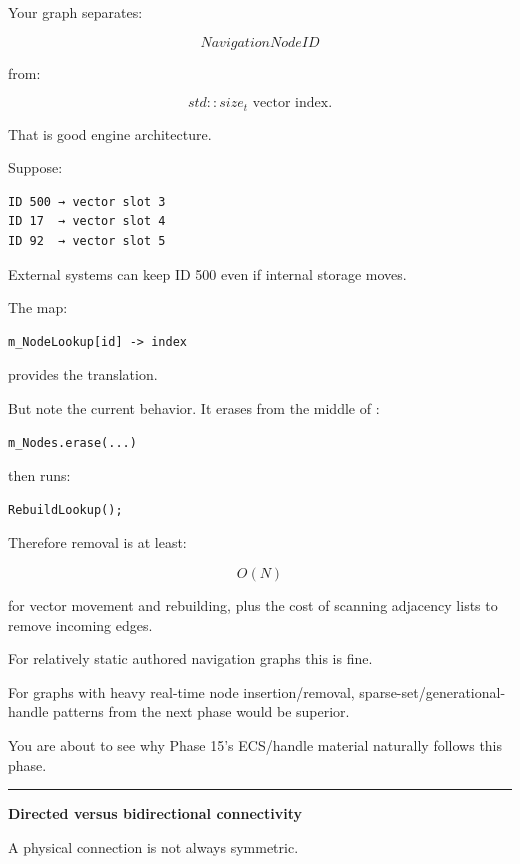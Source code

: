 Your graph separates:

\[
NavigationNodeID
\]

from:

\[
std::size_t\text{ vector index}.
\]

That is good engine architecture.

Suppose:

\begin{verbatim}
ID 500 → vector slot 3
ID 17  → vector slot 4
ID 92  → vector slot 5
\end{verbatim}

External systems can keep ID 500 even if internal storage moves.

The map:

\begin{verbatim}
m_NodeLookup[id] -> index
\end{verbatim}

provides the translation.

But note the current  behavior. It erases from the middle of :

\begin{verbatim}
m_Nodes.erase(...)
\end{verbatim}

then runs:

\begin{verbatim}
RebuildLookup();
\end{verbatim}

Therefore removal is at least:

\[
O(N)
\]

for vector movement and rebuilding, plus the cost of scanning adjacency lists to remove incoming edges.

For relatively static authored navigation graphs this is fine.

For graphs with heavy real-time node insertion/removal, sparse-set/generational-handle patterns from the next phase would be superior.

You are about to see why Phase 15's ECS/handle material naturally follows this phase.

\begin{center}\rule{0.5\linewidth}{0.5pt}\end{center}

\textbf{Directed versus bidirectional connectivity}

A physical connection is not always symmetric.


